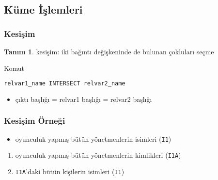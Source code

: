 \documentclass[dvipsnames]{beamer}
\theoremstyle{definition}
\newtheorem{tanim}[theorem]{Tanım}
\theoremstyle{example}
\theoremstyle{plain}
\begin{document}
\subsection{Küme İşlemleri}

\begin{frame}[fragile]
  \frametitle{Kesişim}

  \begin{tanim}
    \alert{kesişim}: iki bağıntı değişkeninde de bulunan çokluları seçme
  \end{tanim}

  \pause
  \begin{block}{Komut}
    \begin{lstlisting}
relvar1_name INTERSECT relvar2_name
    \end{lstlisting}
  \end{block}

  \pause
  \begin{itemize}
    \item çıktı başlığı = relvar1 başlığı = relvar2 başlığı
  \end{itemize}
\end{frame}

\begin{frame}
  \frametitle{Kesişim Örneği}

  \begin{example}
    \begin{itemize}
      \item oyunculuk yapmış bütün yönetmenlerin isimleri (\texttt{I1})
    \end{itemize}

    \pause
    \begin{enumerate}
      \item oyunculuk yapmış bütün yönetmenlerin kimlikleri (\texttt{I1A})

      \pause
      \item \texttt{I1A}'daki bütün kişilerin isimleri (\texttt{I1})
    \end{enumerate}
  \end{example}
\end{frame}
\end{document}
